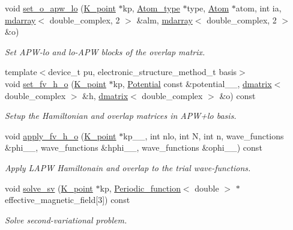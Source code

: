 \begin{DoxyCompactItemize}
\item 
void \hyperlink{classsirius_1_1_band_a9ba2b7a8ab8c0de9287a7a70a5cf8b6a}{set\+\_\+o\+\_\+apw\+\_\+lo} (\hyperlink{classsirius_1_1_k__point}{K\+\_\+point} $\ast$kp, \hyperlink{classsirius_1_1_atom__type}{Atom\+\_\+type} $\ast$type, \hyperlink{classsirius_1_1_atom}{Atom} $\ast$atom, int ia, \hyperlink{classsddk_1_1mdarray}{mdarray}$<$ double\+\_\+complex, 2 $>$ \&alm, \hyperlink{classsddk_1_1mdarray}{mdarray}$<$ double\+\_\+complex, 2 $>$ \&o)
\begin{DoxyCompactList}\small\item\em Set A\+P\+W-\/lo and lo-\/\+A\+P\+W blocks of the overlap matrix. \end{DoxyCompactList}\item 
{\footnotesize template$<$device\+\_\+t pu, electronic\+\_\+structure\+\_\+method\+\_\+t basis$>$ }\\void \hyperlink{classsirius_1_1_band_abc15ad786624f84a6472d4677e7d2e43}{set\+\_\+fv\+\_\+h\+\_\+o} (\hyperlink{classsirius_1_1_k__point}{K\+\_\+point} $\ast$kp, \hyperlink{classsirius_1_1_potential}{Potential} const \&potential\+\_\+\+\_\+, \hyperlink{classsddk_1_1dmatrix}{dmatrix}$<$ double\+\_\+complex $>$ \&h, \hyperlink{classsddk_1_1dmatrix}{dmatrix}$<$ double\+\_\+complex $>$ \&o) const 
\begin{DoxyCompactList}\small\item\em Setup the Hamiltonian and overlap matrices in A\+P\+W+lo basis. \end{DoxyCompactList}\item 
void \hyperlink{classsirius_1_1_band_ab4cfe30dfeba7b682d664529055b6242}{apply\+\_\+fv\+\_\+h\+\_\+o} (\hyperlink{classsirius_1_1_k__point}{K\+\_\+point} $\ast$kp\+\_\+\+\_\+, int nlo, int N, int n, wave\+\_\+functions \&phi\+\_\+\+\_\+, wave\+\_\+functions \&hphi\+\_\+\+\_\+, wave\+\_\+functions \&ophi\+\_\+\+\_\+) const 
\begin{DoxyCompactList}\small\item\em Apply L\+A\+P\+W Hamiltonain and overlap to the trial wave-\/functions. \end{DoxyCompactList}\item 
void \hyperlink{classsirius_1_1_band_a24364a5a4842ce8fdb202d3d38cfed44}{solve\+\_\+sv} (\hyperlink{classsirius_1_1_k__point}{K\+\_\+point} $\ast$kp, \hyperlink{classsirius_1_1_periodic__function}{Periodic\+\_\+function}$<$ double $>$ $\ast$effective\+\_\+magnetic\+\_\+field\mbox{[}3\mbox{]}) const 
\begin{DoxyCompactList}\small\item\em Solve second-\/variational problem. \end{DoxyCompactList}\item 

\end{DoxyCompactItemize}
